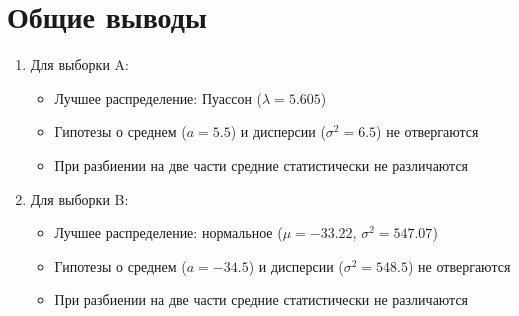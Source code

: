 \documentclass[12pt]{article}
\begin{document}
\section*{Общие выводы}
\begin{enumerate}
\item Для выборки A:
\begin{itemize}
\item Лучшее распределение: Пуассон ($\lambda = 5.605$)
\item Гипотезы о среднем ($a = 5.5$) и дисперсии ($\sigma^2 = 6.5$) не отвергаются
\item При разбиении на две части средние статистически не различаются
\end{itemize}

\item Для выборки B:
\begin{itemize}
\item Лучшее распределение: нормальное ($\mu = -33.22$, $\sigma^2 = 547.07$)
\item Гипотезы о среднем ($a = -34.5$) и дисперсии ($\sigma^2 = 548.5$) не отвергаются
\item При разбиении на две части средние статистически не различаются
\end{itemize}
\end{enumerate}
\end{document}
